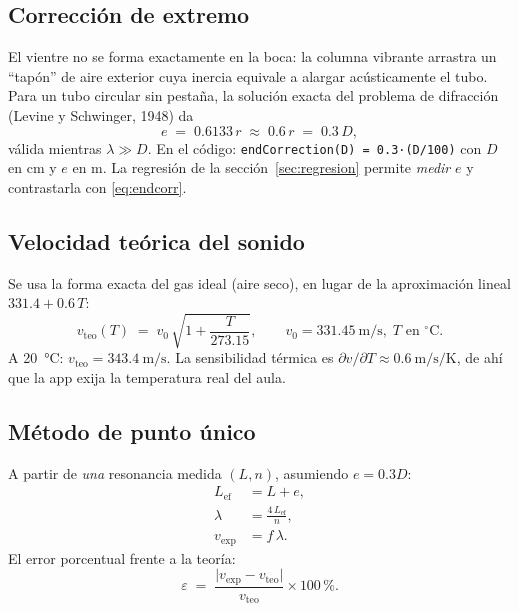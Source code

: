 \documentclass[11pt,a4paper]{article}
\newcommand{\vexp}{v_{\text{exp}}}
\newcommand{\vteo}{v_{\text{teo}}}
\newcommand{\Lef}{L_{\text{ef}}}
\begin{document}
\subsection{Corrección de extremo}

El vientre no se forma exactamente en la boca: la columna vibrante arrastra un ``tapón'' de
aire exterior cuya inercia equivale a alargar acústicamente el tubo. Para un tubo circular
sin pestaña, la solución exacta del problema de difracción (Levine y Schwinger, 1948) da
\begin{equation}
  e \;=\; 0.6133\,r \;\approx\; 0.6\,r \;=\; 0.3\,D ,
  \label{eq:endcorr}
\end{equation}
válida mientras $\lambda \gg D$. En el código: \texttt{endCorrection(D) = 0.3·(D/100)} con
$D$ en \si{\centi\metre} y $e$ en \si{\metre}. La regresión de la sección~\ref{sec:regresion}
permite \emph{medir} $e$ y contrastarla con \eqref{eq:endcorr}.

\subsection{Velocidad teórica del sonido}

Se usa la forma exacta del gas ideal (aire seco), en lugar de la aproximación lineal
$331.4 + 0.6\,T$:
\begin{equation}
  \vteo(T) \;=\; v_0\,\sqrt{1 + \frac{T}{273.15}},
  \qquad v_0 = \SI{331.45}{\metre\per\second},\; T\text{ en }^{\circ}\text{C}.
  \label{eq:vteo}
\end{equation}
A \SI{20}{\celsius}: $\vteo = \SI{343.4}{\metre\per\second}$. La sensibilidad térmica es
$\partial v/\partial T \approx \SI{0.6}{\metre\per\second\per\kelvin}$, de ahí que la app
exija la temperatura real del aula.

\subsection{Método de punto único}

A partir de \emph{una} resonancia medida $(L, n)$, asumiendo $e = 0.3D$:
\begin{align}
  \Lef &= L + e, \\
  \lambda &= \frac{4\,\Lef}{n}, \label{eq:lambda} \\
  \vexp &= f\,\lambda . \label{eq:vexp}
\end{align}
El error porcentual frente a la teoría:
\begin{equation}
  \varepsilon \;=\; \frac{\lvert \vexp - \vteo \rvert}{\vteo}\times 100\,\% .
\end{equation}
\end{document}
